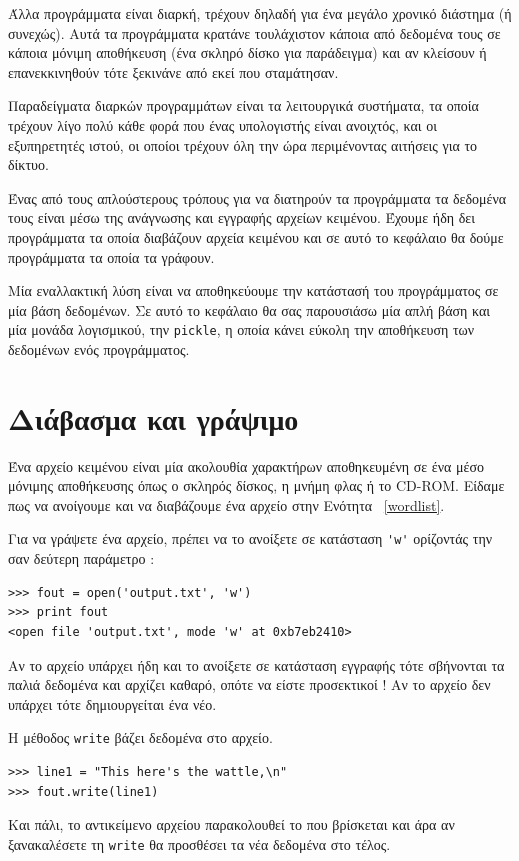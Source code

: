 \documentclass[10pt]{book}
\begin{document}
Άλλα προγράμματα είναι διαρκή, τρέχουν δηλαδή για ένα μεγάλο χρονικό διάστημα (ή συνεχώς). Αυτά τα προγράμματα κρατάνε τουλάχιστον κάποια από δεδομένα τους σε κάποια μόνιμη αποθήκευση (ένα σκληρό δίσκο για παράδειγμα) και αν κλείσουν ή επανεκκινηθούν τότε ξεκινάνε από εκεί που σταμάτησαν.

Παραδείγματα διαρκών προγραμμάτων είναι τα λειτουργικά συστήματα, τα οποία τρέχουν λίγο 
πολύ κάθε φορά που ένας υπολογιστής είναι ανοιχτός, και οι εξυπηρετητές ιστού, οι οποίοι 
τρέχουν όλη την ώρα περιμένοντας αιτήσεις για το δίκτυο.

Ένας από τους απλούστερους τρόπους για να διατηρούν τα προγράμματα τα δεδομένα τους είναι μέσω της ανάγνωσης και εγγραφής αρχείων κειμένου. Έχουμε ήδη δει προγράμματα τα οποία διαβάζουν αρχεία κειμένου και σε αυτό το κεφάλαιο θα δούμε προγράμματα τα οποία τα γράφουν.

Μία εναλλακτική λύση είναι να αποθηκεύουμε την κατάστασή του προγράμματος σε μία βάση 
δεδομένων. Σε αυτό το κεφάλαιο θα σας παρουσιάσω μία απλή βάση και μία μονάδα λογισμικού, την  {\tt pickle},  η οποία κάνει εύκολη την αποθήκευση των δεδομένων ενός  προγράμματος.


\section{Διάβασμα και γράψιμο}

Ένα αρχείο κειμένου είναι μία ακολουθία χαρακτήρων αποθηκευμένη σε ένα μέσο μόνιμης αποθήκευσης όπως ο σκληρός δίσκος, η μνήμη φλας ή το  CD-ROM.  Είδαμε πως να ανοίγουμε και να διαβάζουμε ένα αρχείο στην Ενότητα ~\ref{wordlist}.

 Για να γράψετε ένα αρχείο, πρέπει να το ανοίξετε σε κατάσταση  \verb"'w'"  ορίζοντάς την σαν δεύτερη παράμετρο :

\begin{verbatim}
>>> fout = open('output.txt', 'w')
>>> print fout
<open file 'output.txt', mode 'w' at 0xb7eb2410>
\end{verbatim}
%
 Αν το αρχείο υπάρχει ήδη και το ανοίξετε σε κατάσταση εγγραφής τότε σβήνονται τα 
παλιά δεδομένα και αρχίζει καθαρό, οπότε να είστε προσεκτικοί !  Αν το αρχείο 
δεν υπάρχει τότε δημιουργείται ένα νέο.

Η μέθοδος  {\tt write}  βάζει δεδομένα στο αρχείο.  

\begin{verbatim}
>>> line1 = "This here's the wattle,\n"
>>> fout.write(line1)
\end{verbatim}
%
 Και πάλι, το αντικείμενο αρχείου παρακολουθεί το που βρίσκεται και άρα αν ξανακαλέσετε 
τη  {\tt write}  θα προσθέσει τα νέα δεδομένα στο τέλος. 
\end{document}
